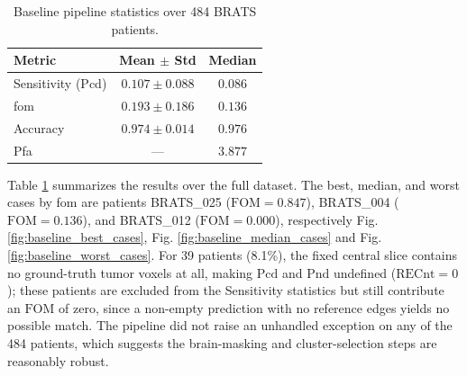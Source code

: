 \begin{table}[htbp]
\centering
\caption{Baseline pipeline statistics over 484 BRATS patients.}
\label{tab:baseline_stats}
\begin{tabular}{lcc}
\toprule
Metric & Mean $\pm$ Std & Median \\
\midrule
Sensitivity (Pcd) & $0.107 \pm 0.088$ & $0.086$ \\
\gls{fom} & $0.193 \pm 0.186$ & $0.136$ \\
Accuracy & $0.974 \pm 0.014$ & $0.976$ \\
Pfa & --- & $3.877$ \\
\bottomrule
\end{tabular}
\end{table}
Table \ref{tab:baseline_stats} summarizes the results over the full dataset. The best, median, and worst cases by \gls{fom} are patients BRATS\_025 ($\mathrm{FOM}=0.847$), BRATS\_004 ($\mathrm{FOM}=0.136$), and BRATS\_012 ($\mathrm{FOM}=0.000$), respectively Fig. \ref{fig:baseline_best_cases}, Fig. \ref{fig:baseline_median_cases} and Fig. \ref{fig:baseline_worst_cases}. For 39 patients (8.1\%), the fixed central slice contains no ground-truth tumor voxels at all, making $\mathrm{Pcd}$ and $\mathrm{Pnd}$ undefined ($\mathrm{RECnt}=0$); these patients are excluded from the Sensitivity statistics but still contribute an $\mathrm{FOM}$ of zero, since a non-empty prediction with no reference edges yields no possible match. The pipeline did not raise an unhandled exception on any of the 484 patients, which suggests the brain-masking and cluster-selection steps are reasonably robust.
